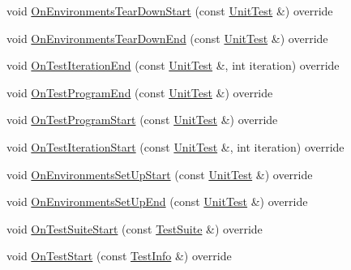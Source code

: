 \begin{DoxyCompactItemize}
\item 
void \mbox{\hyperlink{classtesting_1_1internal_1_1_event_recording_listener2_a9b29ac6408f671e6b0fcafba75238573}{On\+Environments\+Tear\+Down\+Start}} (const \mbox{\hyperlink{classtesting_1_1_unit_test}{Unit\+Test}} \&) override
\item 
void \mbox{\hyperlink{classtesting_1_1internal_1_1_event_recording_listener2_ac0c920b1264e59dfa7e8c9d159a77e8b}{On\+Environments\+Tear\+Down\+End}} (const \mbox{\hyperlink{classtesting_1_1_unit_test}{Unit\+Test}} \&) override
\item 
void \mbox{\hyperlink{classtesting_1_1internal_1_1_event_recording_listener2_ae93c576efaf6f6d3afc455d05aa9eda8}{On\+Test\+Iteration\+End}} (const \mbox{\hyperlink{classtesting_1_1_unit_test}{Unit\+Test}} \&, int iteration) override
\item 
void \mbox{\hyperlink{classtesting_1_1internal_1_1_event_recording_listener2_a95aeef757bba790c159b5a422030a86b}{On\+Test\+Program\+End}} (const \mbox{\hyperlink{classtesting_1_1_unit_test}{Unit\+Test}} \&) override
\item 
void \mbox{\hyperlink{classtesting_1_1internal_1_1_event_recording_listener2_a461f961badc2be6e633df136bc8e3d29}{On\+Test\+Program\+Start}} (const \mbox{\hyperlink{classtesting_1_1_unit_test}{Unit\+Test}} \&) override
\item 
void \mbox{\hyperlink{classtesting_1_1internal_1_1_event_recording_listener2_ab208d8583e6593b4c7d89db6f8f2600b}{On\+Test\+Iteration\+Start}} (const \mbox{\hyperlink{classtesting_1_1_unit_test}{Unit\+Test}} \&, int iteration) override
\item 
void \mbox{\hyperlink{classtesting_1_1internal_1_1_event_recording_listener2_a555f80451b123922a7f21930e45a256f}{On\+Environments\+Set\+Up\+Start}} (const \mbox{\hyperlink{classtesting_1_1_unit_test}{Unit\+Test}} \&) override
\item 
void \mbox{\hyperlink{classtesting_1_1internal_1_1_event_recording_listener2_ae6a3c429dd5df55c869377186411a90a}{On\+Environments\+Set\+Up\+End}} (const \mbox{\hyperlink{classtesting_1_1_unit_test}{Unit\+Test}} \&) override
\item 
void \mbox{\hyperlink{classtesting_1_1internal_1_1_event_recording_listener2_a6bc3ac71f7f96e9c62b0c7dffd5f66b0}{On\+Test\+Suite\+Start}} (const \mbox{\hyperlink{classtesting_1_1_test_suite}{Test\+Suite}} \&) override
\item 
void \mbox{\hyperlink{classtesting_1_1internal_1_1_event_recording_listener2_ac3231fff64b23bbd05e3a2cc57e20df9}{On\+Test\+Start}} (const \mbox{\hyperlink{classtesting_1_1_test_info}{Test\+Info}} \&) override

\end{DoxyCompactItemize}
